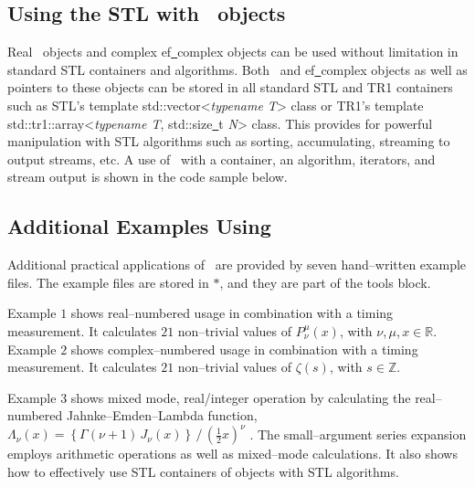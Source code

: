 \vspace{4.0pt}



\vspace{4.0pt}

\subsection{Using the STL with \efloathyperref\ objects}

Real \efloat\ objects and complex
{\courier ef\underline\ complex} objects can be used
without limitation in standard STL containers and algorithms.
Both \efloat\ and {\courier ef\underline\ complex}
objects as well as pointers to these objects can be stored in all standard
STL and TR1 containers such as STL's template
{\courier std::\-vec\-tor<{\it typename T}>} class or TR1's template
{\courier std::\-tr1::\-array<{\it typename T}, {\courier std::\-size\underline\ t} {\it N}>}
class. This provides for powerful manipulation with STL algorithms such as
sorting, accumulating, streaming to output streams, etc. A use of
\efloat\ with a container, an algorithm, iterators, and stream output
is shown in the code sample below.

\vspace{4.0pt}



\vspace{4.0pt}

\subsection{Additional Examples Using \efloathyperref}

Additional practical applications of \efloat\ are provided by seven
hand--written example files. The example files are stored in
{}$\ast${}, and they are
part of the tools block.

Example $1$ shows real--numbered usage in combination
with a timing measurement. It calculates $21$ non--trivial
values of $P_{\nu}^{\mu}(x)$, with $\nu$,$\,\mu$,$\,x\in\mathbb{R}$.
Example $2$ shows complex--num\-ber\-ed usage in combination
with a timing measurement. It calculates $21$ non--trivial
values of $\zeta(s)$, with $s\in\mathbb{Z}$.

Example $3$ shows mixed mode, real/integer operation by calculating the
real--num\-ber\-ed Jahnke--Emden--Lambda function,
$\Lambda_{\nu}(x)=\left\{\Gamma(\nu+1)\,J_{\nu}(x)\right\}\,/\,\left(\frac{1}{2}x\right)^{\nu}$
\cite{jahnkeemden:textbook}.
The small--argument series expansion employs arithmetic
operations as well as mixed--mode calculations.
It also shows how to effectively use STL containers of
{}
objects with STL algorithms.

